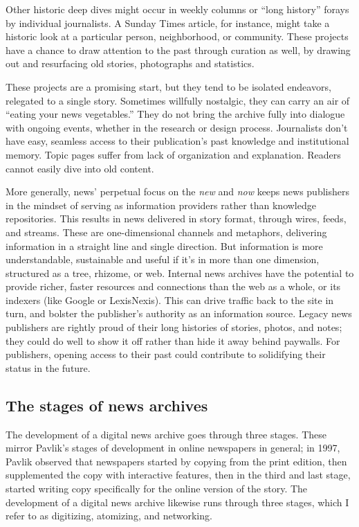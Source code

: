 Other historic deep dives might occur in weekly columns or ``long history'' forays by individual journalists. A Sunday Times article, for instance, might take a historic look at a particular person, neighborhood, or community. These projects have a chance to draw attention to the past through curation as well, by drawing out and resurfacing old stories, photographs and statistics.


These projects are a promising start, but they tend to be isolated endeavors, relegated to a single story. Sometimes willfully nostalgic, they can carry an air of ``eating your news vegetables.'' They do not bring the archive fully into dialogue with ongoing events, whether in the research or design process. Journalists don't have easy, seamless access to their publication's past knowledge and institutional memory. Topic pages suffer from lack of organization and explanation. Readers cannot easily dive into old content.

More generally, news' perpetual focus on the \emph{new} and \emph{now} keeps news publishers in the mindset of serving as information providers rather than knowledge repositories. This results in news delivered in story format, through wires, feeds, and streams. These are one-dimensional channels and metaphors, delivering information in a straight line and single direction. But information is more understandable, sustainable and useful if it's in more than one dimension, structured as a tree, rhizome, or web. Internal news archives have the potential to provide richer, faster resources and connections than the web as a whole, or its indexers (like Google or LexisNexis). This can drive traffic back to the site in turn, and bolster the publisher's authority as an information source. Legacy news publishers are rightly proud of their long histories of stories, photos, and notes; they could do well to show it off rather than hide it away behind paywalls. For publishers, opening access to their past could contribute to solidifying their status in the future.

\subsection{The stages of news archives}

The development of a digital news archive goes through three stages. These mirror Pavlik's stages of development in online newspapers in general; in 1997, Pavlik observed that newspapers started by copying from the print edition, then supplemented the copy with interactive features, then in the third and last stage, started writing copy specifically for the online version of the story. The development of a digital news archive likewise runs through three stages, which I refer to as digitizing, atomizing, and networking.

